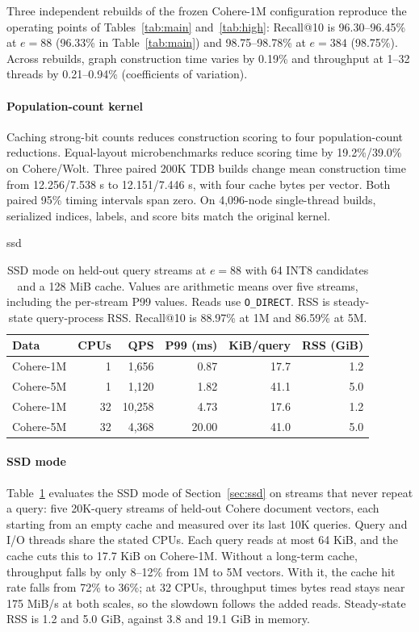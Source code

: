 Three independent rebuilds of the frozen Cohere-1M configuration reproduce the operating points of Tables~\ref{tab:main} and~\ref{tab:high}: Recall@10 is 96.30--96.45\% at $e=88$ (96.33\% in Table~\ref{tab:main}) and 98.75--98.78\% at $e=384$ (98.75\%). Across rebuilds, graph construction time varies by 0.19\% and throughput at 1--32 threads by 0.21--0.94\% (coefficients of variation).

\paragraph{Population-count kernel}
Caching strong-bit counts reduces construction scoring to four population-count reductions. Equal-layout microbenchmarks reduce scoring time by 19.2\%/39.0\% on Cohere/Wolt. Three paired 200K TDB builds change mean construction time from 12.256/7.538 s to 12.151/7.446 s, with four cache bytes per vector. Both paired 95\% timing intervals span zero. On 4,096-node single-thread builds, serialized indices, labels, and score bits match the original kernel.

\begin{table}[t]
\caption{SSD mode on held-out query streams at $e=88$ with 64 INT8 candidates and a 128 MiB cache. Values are arithmetic means over five streams, including the per-stream P99 values. Reads use \texttt{O\_DIRECT}. RSS is steady-state query-process RSS. Recall@10 is 88.97\% at 1M and 86.59\% at 5M.}
\label{tab:ssd}
\centering
\footnotesize
\setlength{\tabcolsep}{3pt}
\begin{quivercheckedtable}{ssd}
\begin{tabular}{lrrrrr}
\toprule
Data & CPUs & QPS & P99 (ms) & KiB/query & RSS (GiB)\\
\midrule
Cohere-1M & 1 & 1,656 & 0.87 & 17.7 & 1.2\\
Cohere-5M & 1 & 1,120 & 1.82 & 41.1 & 5.0\\
Cohere-1M & 32 & 10,258 & 4.73 & 17.6 & 1.2\\
Cohere-5M & 32 & 4,368 & 20.00 & 41.0 & 5.0\\
\bottomrule
\end{tabular}
\end{quivercheckedtable}
\end{table}

\paragraph{SSD mode}
Table~\ref{tab:ssd} evaluates the SSD mode of Section~\ref{sec:ssd} on streams that never repeat a query: five 20K-query streams of held-out Cohere document vectors, each starting from an empty cache and measured over its last 10K queries. Query and I/O threads share the stated CPUs. Each query reads at most 64 KiB, and the cache cuts this to 17.7 KiB on Cohere-1M. Without a long-term cache, throughput falls by only 8--12\% from 1M to 5M vectors. With it, the cache hit rate falls from 72\% to 36\%; at 32 CPUs, throughput times bytes read stays near 175 MiB/s at both scales, so the slowdown follows the added reads. Steady-state RSS is 1.2 and 5.0 GiB, against 3.8 and 19.1 GiB in memory.

